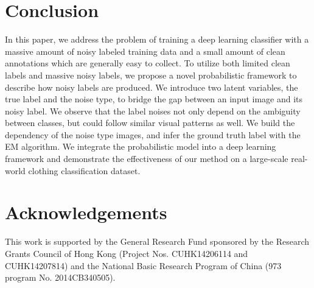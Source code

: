 \documentclass[10pt,twocolumn,letterpaper]{article}
\begin{document}
\section{Conclusion} %
\label{sec:conclusion}
In this paper, we address the problem of training a deep learning classifier with a massive amount of noisy labeled training data and a small amount of clean annotations which are generally easy to collect. To utilize both limited clean labels and massive noisy labels, we propose a novel probabilistic framework to describe how noisy labels are produced. We introduce two latent variables, the true label and the noise type, to bridge the gap between an input image and its noisy label. We observe that the label noises not only depend on the ambiguity between classes, but could follow similar visual patterns as well. We build the dependency of the noise type \wrt images, and infer the ground truth label with the EM algorithm. We integrate the probabilistic model into a deep learning framework and demonstrate the effectiveness of our method on a large-scale real-world clothing classification dataset.

\section*{Acknowledgements}
\label{sec:acknowledgements}
This work is supported by the General Research Fund sponsored by the Research Grants Council of Hong Kong (Project Nos. CUHK14206114 and CUHK14207814) and the National Basic Research Program of China (973 program No. 2014CB340505).


{\small


}
\end{document}
